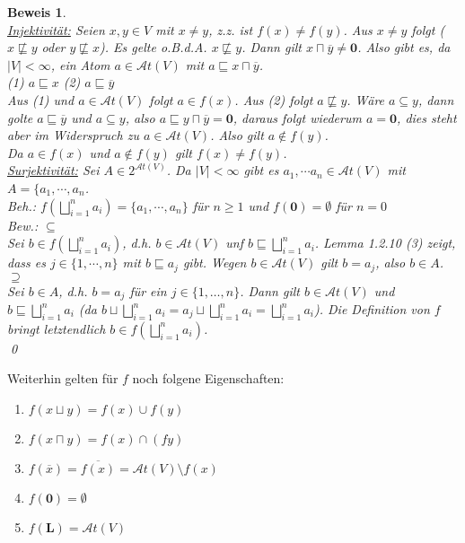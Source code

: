 \documentclass[ngerman]{scrartcl}
\theoremstyle{custom}
\newtheorem*{bw}{Beweis}
\newcommand{\0}{\mathbf{0}}
\newcommand{\1}{\mathbf{L}}
\newcommand{\at}{\mathcal{A}t}
\begin{document}
\begin{bw} ~\\
\underline{Injektivit\"at:} Seien $x,y \in V$ mit $x \not= y$, z.z. ist $f(x) \not=
f(y)$. Aus $x \not= y$ folgt ($x \not \sqsubseteq y$ oder $y \not
\sqsubseteq x$). Es gelte o.B.d.A. $x \not \sqsubseteq y$. Dann gilt
$x \sqcap \overline{y} \not= \0$. Also gibt es, da $\vert V \vert <
\infty$, ein Atom $a \in \at(V)$ mit $a \sqsubseteq x \sqcap
\overline{y}$.\\

(1) $a \sqsubseteq x$ \hspace{3cm}
(2) $a \sqsubseteq \overline{y}$\\

Aus (1) und $a \in \at(V)$ folgt $a \in f(x)$. Aus (2) folgt $a \not
\sqsubseteq y$. W\"are $a \subseteq y$, dann golte $a \sqsubseteq
\overline{y}$ und $a \subseteq y$, also $a \sqsubseteq y \sqcap
\overline{y} = \0$, daraus folgt wiederum $a = \0$, dies steht aber im
Widerspruch zu $a \in \at(V)$. Also gilt $a \notin f(y)$.\\
Da $a \in f(x)$ und $a \notin f(y)$ gilt $f(x) \not= f(y)$.
\\
\underline{Surjektivit\"at:} Sei $A \in 2^{\at(V)}$. Da $\vert V \vert
< \infty$ gibt es $a_1, \cdots a_n \in \at(V)$ mit $A = \{a_1, \cdots,
a_n$.\\
Beh.: $f(\bigsqcup_{i=1}^{n} a_i) = \{a_1, \cdots, a_n\}$ f\"ur $n
\geq 1$ und $f(\0) = \emptyset$ f\"ur $n=0$\\
Bew.: $\subseteq$\\
Sei $b \in f (\bigsqcup_{i=1}^{n} a_i)$, d.h. $b \in \at(V)$ unf $b
\sqsubseteq \bigsqcup_{i=1}^{n} a_i$. Lemma 1.2.10 (3) zeigt, dass es
$j \in \{1, \cdots, n\}$ mit $b \sqsubseteq a_j$ gibt. Wegen $b \in
\at(V)$ gilt $b = a_j$, also $b \in A$.\\
$\supseteq$\\
Sei $b \in A$, d.h. $b = a_j$ f\"ur ein $j \in \{1, \dots, n\}$. Dann
gilt $b \in \at(V)$ und $b \sqsubseteq \bigsqcup_{i=1}^{n} a_i$ (da $b
\sqcup \bigsqcup_{i=1}^{n} a_i = a_j \sqcup \bigsqcup_{i=1}^{n} a_i =
\bigsqcup_{i=1}^{n} a_i$). Die Definition von $f$ bringt letztendlich
$b \in f(\bigsqcup_{i=1}^{n} a_i)$.\\
\qed
\end{bw}

Weiterhin gelten f\"ur $f$ noch folgene Eigenschaften:
\begin{enumerate}
\item $f(x \sqcup y) = f(x) \cup f(y)$
\item $f(x \sqcap y) = f(x) \cap (fy)$
\item $f(\overline{x}) = \overline{f(x)} = \at(V) \setminus f(x)$
\item $f(\0) = \emptyset$
\item $f(\1) = \at(V)$
\end{enumerate}
\end{document}
